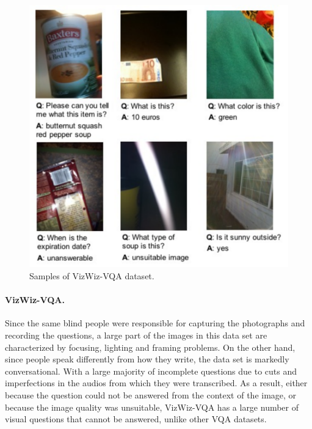 \begin{figure}[ht!]
    \centering
    \includegraphics[width=\linewidth]{images/intro/vizwiz_samples.pdf}
\caption{Samples of VizWiz-VQA dataset.}
\label{fig:vizwiz_samples}
\end{figure}


\paragraph{\textbf{VizWiz-VQA.}}
Since the same blind people were responsible for capturing the photographs and recording the questions, a large part of the images in this data set are characterized by focusing, lighting and framing problems. On the other hand, since people speak differently from how they write, the data set is markedly conversational. With a large majority of incomplete questions due to cuts and imperfections in the audios from which they were transcribed.
As a result, either because the question could not be answered from the context of the image, or because the image quality was unsuitable, VizWiz-VQA has a large number of visual questions that cannot be answered, unlike other VQA datasets.

